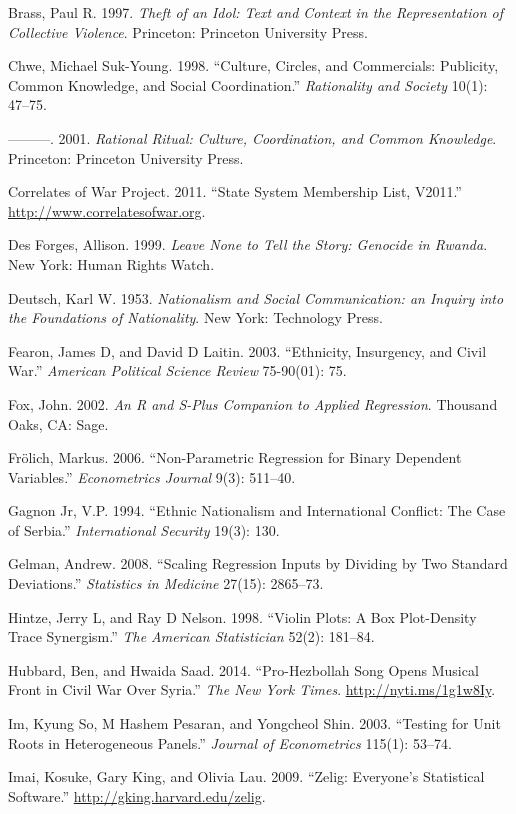 \documentclass[12pt,article,oneside]{memoir}
\begin{document}
Brass, Paul R. 1997. \emph{Theft of an Idol: Text and Context in the
Representation of Collective Violence}. Princeton: Princeton University
Press.

Chwe, Michael Suk-Young. 1998. ``Culture, Circles, and Commercials:
Publicity, Common Knowledge, and Social Coordination.''
\emph{Rationality and Society} 10(1): 47--75.

---------. 2001. \emph{Rational Ritual: Culture, Coordination, and
Common Knowledge}. Princeton: Princeton University Press.

Correlates of War Project. 2011. ``State System Membership List,
V2011.'' \url{http://www.correlatesofwar.org}.

Des Forges, Allison. 1999. \emph{Leave None to Tell the Story: Genocide
in Rwanda}. New York: Human Rights Watch.

Deutsch, Karl W. 1953. \emph{Nationalism and Social Communication: an
Inquiry into the Foundations of Nationality}. New York: Technology
Press.

Fearon, James D, and David D Laitin. 2003. ``Ethnicity, Insurgency, and
Civil War.'' \emph{American Political Science Review} 75-90(01): 75.

Fox, John. 2002. \emph{An R and S-Plus Companion to Applied Regression}.
Thousand Oaks, CA: Sage.

Fr{ö}lich, Markus. 2006. ``Non-Parametric Regression for Binary
Dependent Variables.'' \emph{Econometrics Journal} 9(3): 511--40.

Gagnon Jr, V.P. 1994. ``Ethnic Nationalism and International Conflict:
The Case of Serbia.'' \emph{International Security} 19(3): 130.

Gelman, Andrew. 2008. ``Scaling Regression Inputs by Dividing by Two
Standard Deviations.'' \emph{Statistics in Medicine} 27(15): 2865--73.

Hintze, Jerry L, and Ray D Nelson. 1998. ``Violin Plots: A Box
Plot-Density Trace Synergism.'' \emph{The American Statistician} 52(2):
181--84.

Hubbard, Ben, and Hwaida Saad. 2014. ``Pro-Hezbollah Song Opens Musical
Front in Civil War Over Syria.'' \emph{The New York Times}.
\url{http://nyti.ms/1g1w8Iy}.

Im, Kyung So, M Hashem Pesaran, and Yongcheol Shin. 2003. ``Testing for
Unit Roots in Heterogeneous Panels.'' \emph{Journal of Econometrics}
115(1): 53--74.

Imai, Kosuke, Gary King, and Olivia Lau. 2009. ``Zelig: Everyone's
Statistical Software.'' \url{http://gking.harvard.edu/zelig}.
\end{document}
